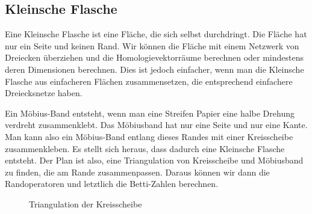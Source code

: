 %
%
%
\subsection{Kleinsche Flasche}
Eine Kleinsche Flasche ist eine Fläche, die sich selbst durchdringt.
Die Fläche hat nur ein Seite und keinen Rand.
Wir können die Fläche mit einem Netzwerk von Dreiecken überziehen
und die Homologievektorräume berechnen oder mindestens deren Dimensionen
berechnen.
Dies ist jedoch einfacher, wenn man die Kleinsche Flasche aus einfacheren
Flächen zusammensetzen, die entsprechend einfachere Dreiecksnetze
haben.

Ein Möbius-Band entsteht, wenn man eine Streifen Papier eine halbe 
Drehung verdreht zusammenklebt.
Das Möbiusband hat nur eine Seite und nur eine Kante.
Man kann also ein Möbius-Band entlang dieses Randes mit einer
Kreisscheibe zusammenkleben.
Es stellt sich heraus, dass dadurch eine Kleinsche Flasche entsteht.
Der Plan ist also, eine Triangulation von Kreisscheibe und Möbiusband
zu finden, die am Rande zusammenpassen.
Daraus können wir dann die Randoperatoren und letztlich die Betti-Zahlen
berechnen.

\begin{figure}
\centering
{}
\caption{Triangulation der Kreisscheibe
\label{homologie:fig:disk}}
\end{figure}

